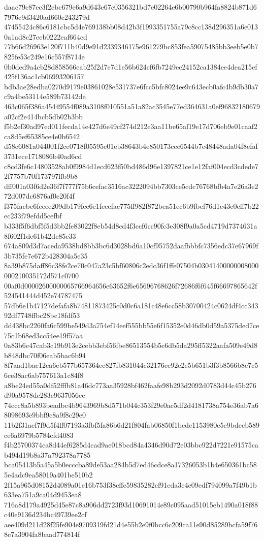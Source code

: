 {daac79c87ec3f2ebc679e6a9d643e67c0356321bd7e02264e6b00790b964fa8824b871d67976c9d3420ad660c243279d
47455424c86c6181cbc5d4e769138bb08d42b3f1993351755a79c8cc138d296351a6e0130a1ad8c27eeb0222eaf664cd
77b66d26963e120f711b40d9e91d2339346175e961279bc853fea59075485bb3eeb5e0b7825fe53c249e16c557f8714e
0b0ded9a4cb28d858566eab25f2d7e7d1e56b624cf6fb7249ec24152ca1384ee4dea215ef425f136ac1cb06993206157
bdb3ae28edba0270d9179e03861028e531737e6fcc5bfc8024ee9c643ecb0afc4b9db30a7c9a4be53114e589b73142de
463c065f386a45449554f089a3108f010551a51a82ac3545e77ed364631a0ef96832180679a02cf2e414bcb5db02b3bb
f5b2ef30ad97ed011fecda14e427d6e49cf274d212e3aa11be65af19e17d706eb9e01caaf2ca8d5ef65385ce4e0b6542
d58c6081a044001f2ce0718f05595e01eb38643b4e850173cee6544b7c48448ada04f8efaf3731ece1718086b40ad6cd
c8cd3fe6c14803528ab0f9984d1ecd623f50bd486d96e1397821ce1e12faf004ecd3cdede72f7757b70f173797ffb9b8
dff001a03f6d2e36f7f777f75b6cefac3516ac3222094bb7303ce5cdc76768bfb4a7e26a3e272d007dc6876af0e20f4f
f375facbe6feeee209db179fee6e1feeefae775ff982f872bea51ec6b9fbef76d1e43c0cff7b22ec233f79efdd5cefbf
b333f5f6dbf5f5d3bb2fe83022f8eb54d8cd4f3ccf6cc90fc3e308f9a0a5cd4719d7374631a8f602f1de61b42dc85e33
674a809d3d7aceda9538bd8bb3bc6d3028bd6a10cf95752daafbbbfc7356edc37e67969f3b735fe7e672b428304a5e35
8a39b875daff86c38fe2ce70c047a23c5bf60806c2edc36f1ffe07504b03041400000008000000210035172d571c0700
00af0d00002600000065766964656e63652f6e65696768626f72686f6f645f66697865642f524541444d452e74787475
57db6e1b47127defafa8b74811873425c0d0c6a181c48e6cc58b30700424c0624df4cc34392df7748ffbc28bc18fdf53
dd438bc2260fa6c599be549d3a754ef14eef555bb55e6f15352e0d46db0d59a5375ded7ce75c1b68ed3cc54ee19f57aa
0a83b6e47cab3c19b913e2cebb3ebf56fbe86513554b5e6db5da295ff5322aafa509e49d8b848dbc70f06eab5bac6b94
8f7aad1bac12ca6eb577b657364ec827fb831044c32176ce92e2e5b651b3f3b8566b8e7c56ce38ac6ab757613a1c84f8
a8be24ed55a0df52fffb81a46dc773aa35928bf462faafe98b293d2092d0783d44c45b276d90a9578dc283e9637056ec
74ecc8a5b893beadbc4b9643969b8d571b044c353f29e0ac5df2d4181738a754e36ab7a68098693e9bbf9c8a9f8c29e0
11b2f31aef7f9d5f4ff07193a3fbf5fa86b6d21f804fab06850f1bcde1153980e5e9bdecb589ce6a6979b5784cfd4083
f4b25700374ca8d44ef6285d4cad9ae018bcd84a4346d90d72e03bbc922d7221e91575cab494d19b8a37a792378a7785
bca05413b5a45a5b0ecccba89de53aa284b5d7ed46cdce8a17326053b1b4e650361bc585e4adc9ea58019a401be510b2
2f15a965d08152d4089a01e16b753f38cffc59835282cf91eda3e4c09edf794099a7f49b1b633ea751a9ca04d9453ea8
716a8d179a4925d45e87c8a906dd2723f93d10691014e89c095aad51015eb1490a018f88c40e9136d234bc49739ee2cf
aee409d211d28f25fe904e9709319fd21d4e55b2e9f0bcc6c209ca11e90d85289bcfa59f768e7a3904fa8baad774814f
}
